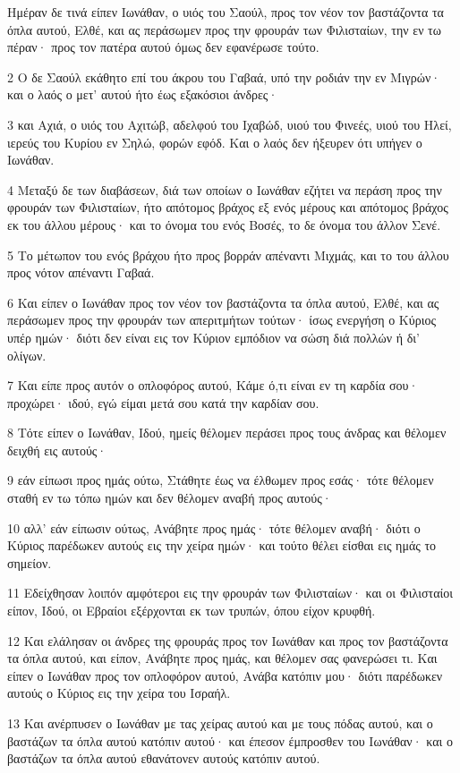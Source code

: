 \par Ημέραν δε τινά είπεν Ιωνάθαν, ο υιός του Σαούλ, προς τον νέον τον βαστάζοντα τα όπλα αυτού, Ελθέ, και ας περάσωμεν προς την φρουράν των Φιλισταίων, την εν τω πέραν· προς τον πατέρα αυτού όμως δεν εφανέρωσε τούτο.
\par 2 Ο δε Σαούλ εκάθητο επί του άκρου του Γαβαά, υπό την ροδιάν την εν Μιγρών· και ο λαός ο μετ' αυτού ήτο έως εξακόσιοι άνδρες·
\par 3 και Αχιά, ο υιός του Αχιτώβ, αδελφού του Ιχαβώδ, υιού του Φινεές, υιού του Ηλεί, ιερεύς του Κυρίου εν Σηλώ, φορών εφόδ. Και ο λαός δεν ήξευρεν ότι υπήγεν ο Ιωνάθαν.
\par 4 Μεταξύ δε των διαβάσεων, διά των οποίων ο Ιωνάθαν εζήτει να περάση προς την φρουράν των Φιλισταίων, ήτο απότομος βράχος εξ ενός μέρους και απότομος βράχος εκ του άλλου μέρους· και το όνομα του ενός Βοσές, το δε όνομα του άλλον Σενέ.
\par 5 Το μέτωπον του ενός βράχου ήτο προς βορράν απέναντι Μιχμάς, και το του άλλου προς νότον απέναντι Γαβαά.
\par 6 Και είπεν ο Ιωνάθαν προς τον νέον τον βαστάζοντα τα όπλα αυτού, Ελθέ, και ας περάσωμεν προς την φρουράν των απεριτμήτων τούτων· ίσως ενεργήση ο Κύριος υπέρ ημών· διότι δεν είναι εις τον Κύριον εμπόδιον να σώση διά πολλών ή δι' ολίγων.
\par 7 Και είπε προς αυτόν ο οπλοφόρος αυτού, Κάμε ό,τι είναι εν τη καρδία σου· προχώρει· ιδού, εγώ είμαι μετά σου κατά την καρδίαν σου.
\par 8 Τότε είπεν ο Ιωνάθαν, Ιδού, ημείς θέλομεν περάσει προς τους άνδρας και θέλομεν δειχθή εις αυτούς·
\par 9 εάν είπωσι προς ημάς ούτω, Στάθητε έως να έλθωμεν προς εσάς· τότε θέλομεν σταθή εν τω τόπω ημών και δεν θέλομεν αναβή προς αυτούς·
\par 10 αλλ' εάν είπωσιν ούτως, Ανάβητε προς ημάς· τότε θέλομεν αναβή· διότι ο Κύριος παρέδωκεν αυτούς εις την χείρα ημών· και τούτο θέλει είσθαι εις ημάς το σημείον.
\par 11 Εδείχθησαν λοιπόν αμφότεροι εις την φρουράν των Φιλισταίων· και οι Φιλισταίοι είπον, Ιδού, οι Εβραίοι εξέρχονται εκ των τρυπών, όπου είχον κρυφθή.
\par 12 Και ελάλησαν οι άνδρες της φρουράς προς τον Ιωνάθαν και προς τον βαστάζοντα τα όπλα αυτού, και είπον, Ανάβητε προς ημάς, και θέλομεν σας φανερώσει τι. Και είπεν ο Ιωνάθαν προς τον οπλοφόρον αυτού, Ανάβα κατόπιν μου· διότι παρέδωκεν αυτούς ο Κύριος εις την χείρα του Ισραήλ.
\par 13 Και ανέρπυσεν ο Ιωνάθαν με τας χείρας αυτού και με τους πόδας αυτού, και ο βαστάζων τα όπλα αυτού κατόπιν αυτού· και έπεσον έμπροσθεν του Ιωνάθαν· και ο βαστάζων τα όπλα αυτού εθανάτονεν αυτούς κατόπιν αυτού.
